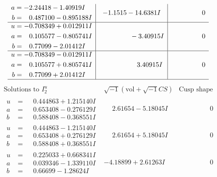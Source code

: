\documentclass[1p]{elsarticle_modified}
\theoremstyle{definition}
\newcommand{\I}{\sqrt{-1}}
\begin{document}
$$\begin{array}{c|c|c}
\begin{aligned}
a &= -2.24418 - 1.40919 I \\
b &= \phantom{-}0.487100 - 0.895188 I\end{aligned}
 & -1.1515 - 14.6381 I & \phantom{-0.000000 } 0 \\ \hline\begin{aligned}
u &= -0.708349 + 0.012911 I \\
a &= \phantom{-}0.105577 - 0.805741 I \\
b &= \phantom{-}0.77099 - 2.01412 I\end{aligned}
 & \phantom{-0.000000 } -3.40915 I & \phantom{-0.000000 } 0 \\ \hline\begin{aligned}
u &= -0.708349 - 0.012911 I \\
a &= \phantom{-}0.105577 + 0.805741 I \\
b &= \phantom{-}0.77099 + 2.01412 I\end{aligned}
 & \phantom{-0.000000 -}3.40915 I & \phantom{-0.000000 } 0\\
 \hline 
 \end{array}$$\newpage$$\begin{array}{c|c|c}  
\text{Solutions to }I^u_{2}& \I (\text{vol} + \sqrt{-1}CS) & \text{Cusp shape}\\
 \hline 
\begin{aligned}
u &= \phantom{-}0.444863 + 1.215140 I \\
a &= \phantom{-}0.653408 - 0.276129 I \\
b &= \phantom{-}0.588408 - 0.368551 I\end{aligned}
 & \phantom{-}2.61654 - 5.18045 I & \phantom{-0.000000 } 0 \\ \hline\begin{aligned}
u &= \phantom{-}0.444863 - 1.215140 I \\
a &= \phantom{-}0.653408 + 0.276129 I \\
b &= \phantom{-}0.588408 + 0.368551 I\end{aligned}
 & \phantom{-}2.61654 + 5.18045 I & \phantom{-0.000000 } 0 \\ \hline\begin{aligned}
u &= \phantom{-}0.225033 + 0.668341 I \\
a &= \phantom{-}0.039346 - 1.339110 I \\
b &= \phantom{-}0.66699 - 1.28624 I\end{aligned}
 & -4.18899 + 2.61263 I & \phantom{-0.000000 } 0 \\ \hline\begin{aligned}

\end{aligned}
\end{array}$$
\end{document}
